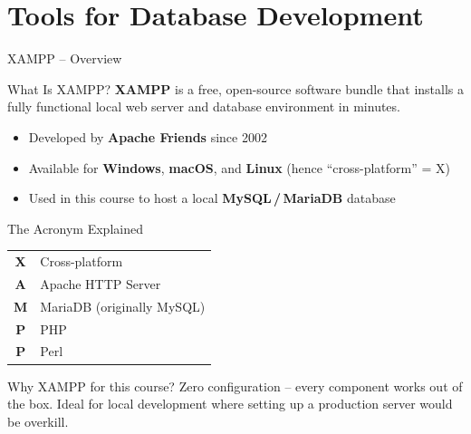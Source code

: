 \section{Tools for Database Development}

\begin{frame}{XAMPP -- Overview}
  \begin{block}{What Is XAMPP?}
    \textbf{XAMPP} is a free, open-source software bundle that installs a fully
    functional local web server and database environment in minutes.
    \begin{itemize}
      \item Developed by \textbf{Apache Friends} since 2002
      \item Available for \textbf{Windows}, \textbf{macOS}, and \textbf{Linux}
            (hence ``cross-platform'' = X)
      \item Used in this course to host a local \textbf{MySQL\,/\,MariaDB} database
    \end{itemize}
  \end{block}

  \begin{block}{The Acronym Explained}
    \centering
    \begin{tabular}{@{}cl@{}}
      \textbf{X} & Cross-platform \\
      \textbf{A} & Apache HTTP Server \\
      \textbf{M} & MariaDB (originally MySQL) \\
      \textbf{P} & PHP \\
      \textbf{P} & Perl \\
    \end{tabular}
  \end{block}

  \begin{alertblock}{Why XAMPP for this course?}
    Zero configuration -- every component works out of the box. Ideal for
    local development where setting up a production server would be overkill.
  \end{alertblock}
\end{frame}

